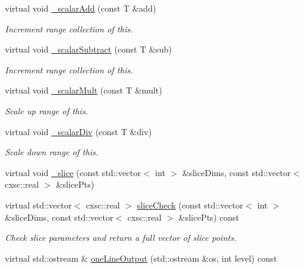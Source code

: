\begin{DoxyCompactItemize}
virtual void \hyperlink{classsubpavings_1_1MappedSPnode_a4ef713013762306de2040ac389ec140a}{\-\_\-scalar\-Add} (const \-T \&add)
\begin{DoxyCompactList}\small\item\em \-Increment range collection of this. \end{DoxyCompactList}\item 
virtual void \hyperlink{classsubpavings_1_1MappedSPnode_a91ab734b6f270c26557964473f4977b4}{\-\_\-scalar\-Subtract} (const \-T \&sub)
\begin{DoxyCompactList}\small\item\em \-Increment range collection of this. \end{DoxyCompactList}\item 
virtual void \hyperlink{classsubpavings_1_1MappedSPnode_ab716b6d35a31dcba9de12114b3139dc2}{\-\_\-scalar\-Mult} (const \-T \&mult)
\begin{DoxyCompactList}\small\item\em \-Scale up range of this. \end{DoxyCompactList}\item 
virtual void \hyperlink{classsubpavings_1_1MappedSPnode_a21cbfaf0019ceb215b9c12df05d394f3}{\-\_\-scalar\-Div} (const \-T \&div)
\begin{DoxyCompactList}\small\item\em \-Scale down range of this. \end{DoxyCompactList}\item 
virtual void \hyperlink{classsubpavings_1_1MappedSPnode_a54fec3e936497db34a821b9138b4ad7b}{\-\_\-slice} (const std\-::vector$<$ int $>$ \&slice\-Dims, const std\-::vector$<$ cxsc\-::real $>$ \&slice\-Pts)
\item 
virtual std\-::vector$<$ cxsc\-::real $>$ \hyperlink{classsubpavings_1_1MappedSPnode_a24ca6f695181dd45e5cf05d22042bb44}{slice\-Check} (const std\-::vector$<$ int $>$ \&slice\-Dims, const std\-::vector$<$ cxsc\-::real $>$ \&slice\-Pts) const 
\begin{DoxyCompactList}\small\item\em \-Check slice parameters and return a full vector of slice points. \end{DoxyCompactList}\item 
virtual std\-::ostream \& \hyperlink{classsubpavings_1_1MappedSPnode_acfbd13653a91c69a7091c6e9c18a6d68}{one\-Line\-Output} (std\-::ostream \&os, int level) const 
\end{DoxyCompactItemize}


